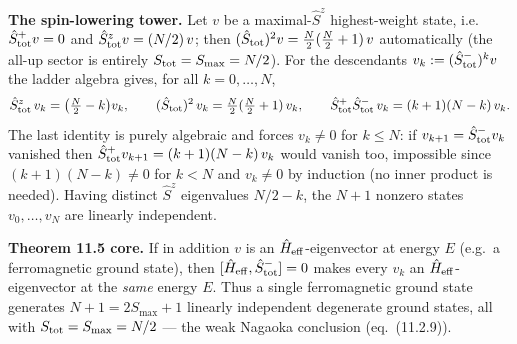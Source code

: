 \documentclass[a4paper,11pt]{article}
\begin{document}
\medskip
\noindent\textbf{The spin-lowering tower.}
Let \(v\) be a maximal-\(\hat S^z\) highest-weight state, i.e.
\(\hat S^+_{\rm tot} v = 0\) and \(\hat S^z_{\rm tot} v = (N/2)\,v\); then
\((\hat S_{\rm tot})^2 v = \tfrac N2(\tfrac N2 + 1)\,v\) automatically (the all-up
sector is entirely \(S_{\rm tot} = S_{\max} = N/2\)). For the descendants
\(v_k := (\hat S^-_{\rm tot})^k v\) the ladder algebra gives, for all
\(k = 0, \dots, N\),
\[
  \hat S^z_{\rm tot}\, v_k = \bigl(\tfrac N2 - k\bigr) v_k,
  \qquad
  (\hat S_{\rm tot})^2\, v_k = \tfrac N2(\tfrac N2+1)\, v_k,
  \qquad
  \hat S^+_{\rm tot}\hat S^-_{\rm tot}\, v_k = (k+1)(N-k)\, v_k.
\]
The last identity is purely algebraic and forces \(v_k \neq 0\) for \(k \le N\):
if \(v_{k+1} = \hat S^-_{\rm tot} v_k\) vanished then
\(\hat S^+_{\rm tot} v_{k+1} = (k+1)(N-k)\, v_k\) would vanish too, impossible
since \((k+1)(N-k) \neq 0\) for \(k < N\) and \(v_k \neq 0\) by induction (no
inner product is needed). Having distinct \(\hat S^z\) eigenvalues \(N/2 - k\),
the \(N+1\) nonzero states \(v_0, \dots, v_N\) are linearly independent.

\medskip
\noindent\textbf{Theorem 11.5 core.}
If in addition \(v\) is an \(\hat H_{\rm eff}\)-eigenvector at energy \(E\) (e.g.\
a ferromagnetic ground state), then \([\hat H_{\rm eff}, \hat S^-_{\rm tot}] = 0\)
makes every \(v_k\) an \(\hat H_{\rm eff}\)-eigenvector at the \emph{same} energy
\(E\). Thus a single ferromagnetic ground state generates
\(N+1 = 2S_{\max} + 1\) linearly independent degenerate ground states, all with
\(S_{\rm tot} = S_{\max} = N/2\) — the weak Nagaoka conclusion (eq.~(11.2.9)).
\end{document}
